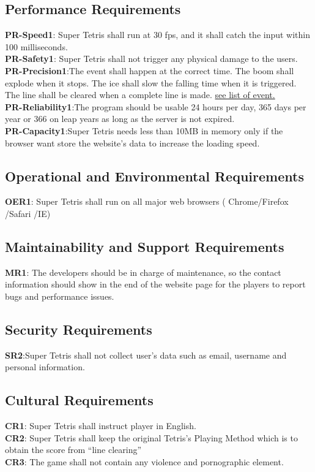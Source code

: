 \documentclass[12pt, titlepage]{article}
\begin{document}
\subsection{Performance Requirements}
\textbf{PR-Speed1}: Super Tetris  shall run at 30 fps, and it  shall catch the input within 100 milliseconds.\\
\newline
\textbf{PR-Safety1}: Super Tetris shall not trigger any physical damage to the users.\\
\newline
\textbf{PR-Precision1}:The event shall happen at the correct time. The boom shall explode when it stops. The ice shall slow the falling time when it is triggered. The line shall be cleared when a complete line is made. \hyperref[listofevent]{see list of event.}\\
\newline
\textbf{PR-Reliability1}:The program should be usable 24 hours per day, 365 days per year or 366 on leap years as long as the server is not expired.\\
\newline
\textbf{PR-Capacity1}:Super Tetris needs less than 10MB in memory only if the browser want store the website’s data to increase the loading speed.
\newpage
\subsection{Operational and Environmental Requirements}
\textbf{OER1}: Super Tetris shall run on all major web browsers ( Chrome/Firefox /Safari /IE)
\subsection{Maintainability and Support Requirements}

\textbf{MR1}: The developers should be in charge of maintenance, so the contact information should show in the end of the website page for the players to report bugs and performance issues. 

\subsection{Security Requirements}

\textbf{SR2}:Super Tetris shall not collect user’s data such as email, username and personal information.

\subsection{Cultural Requirements}
\textbf{CR1}: Super Tetris shall instruct player in English.\\
\newline
\textbf{CR2}: Super Tetris shall keep the original Tetris’s Playing Method which is to obtain the score from “line clearing”\\
\textbf{CR3}: {\color{red} The game shall not contain any violence and pornographic element.}
\end{document}
